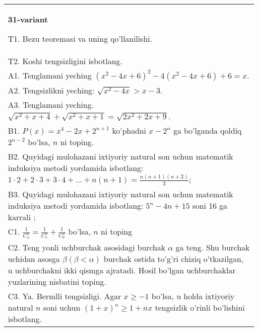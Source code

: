 \documentclass{article}
\begin{document}
\begin{tabular}{m{17cm}}
\textbf{31-variant}
\newline

T1. Bezu teoremasi va uning qo'llanilishi. \\
T2. Koshi tengsizligini isbotlang. \\
A1. Tenglamani yeching \(\left( x^{2} - 4x + 6 \right)^{2} - 4\left( x^{2} - 4x + 6 \right) + 6 = x\). \\
A2. Tengsizlikni yeching: \(\sqrt{x^{2} - 4x} > x - 3\). \\
A3. Tenglamani yeching. \(\sqrt{x^{2} + x + 4} + \sqrt{x^{2} + x + 1} = \sqrt{2x^{2} + 2x + 9}\). \\
B1. \(P(x) = x^{4} - 2x + 2^{n + 1}\) ko'phadni \(x - 2^{n}\) ga bo'lganda qoldiq \(2^{n - 2}\) bo'lsa, \(n\) ni toping. \\
B2. Quyidagi mulohazani ixtiyoriy natural son uchun matematik induksiya metodi yordamida isbotlang: \(1 \cdot 2 + 2 \cdot 3 + 3 \cdot 4 + ... + n(n + 1) = \frac{n(n + 1)(n + 2)}{3}\); \\
B3. Quyidagi mulohazani ixtiyoriy natural son uchun matematik induksiya metodi yordamida isbotlang: \(5^{n} - 4n + 15\) soni 16 ga karrali ; \\
C1. \(\frac{1}{C_{4}^{n}} = \frac{1}{C_{5}^{n}} + \frac{1}{C_{6}^{n}}\) bo'lsa, \(n\) ni toping \\
C2. Teng yonli uchburchak asosidagi burchak \(\alpha\) ga teng. Shu burchak uchidan asosga \(\beta(\beta < \alpha)\) burchak ostida to'g'ri chiziq o'tkazilgan, u uchburchakni ikki qismga ajratadi. Hosil bo'lgan uchburchaklar yuzlarining nisbatini toping. \\
C3. Ya. Bermlli tengsizligi. Agar \(x \geq - 1\) bo'lsa, u holda ixtiyoriy natural \(n\) soni uchun \((1 + x)^{n} \geq 1 + nx\) tengsizlik o'rinli bo'lishini isbotlang. \\

\end{tabular}
\vspace{1cm}
\end{document}
